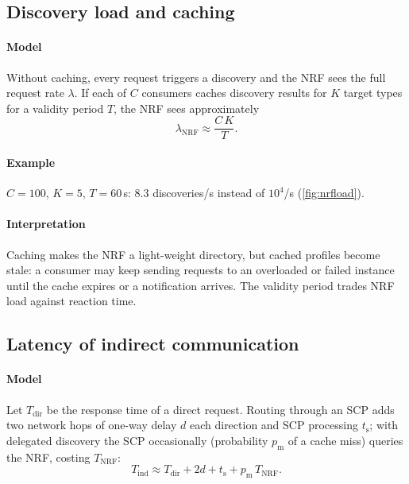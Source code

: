 \documentclass[11pt,a4paper]{article}
\begin{document}
\subsection{Discovery load and caching}\label{sec:cache}
\paragraph{Model} Without caching, every request triggers a discovery and the NRF sees the full request rate $\lambda$. If each of $C$
consumers caches discovery results for $K$ target types for a validity period $T$, the NRF sees approximately
\begin{equation}\label{eq:cache}
  \lambda_{\mathrm{NRF}} \approx \frac{C\,K}{T}.
\end{equation}
\paragraph{Example} $C = 100$, $K = 5$, $T = 60$\,s: 8.3 discoveries/s instead of $10^4$/s (\cref{fig:nrfload}).
\paragraph{Interpretation} Caching makes the NRF a light-weight directory, but cached profiles become stale: a consumer may keep
sending requests to an overloaded or failed instance until the cache expires or a notification arrives. The validity period
trades NRF load against reaction time.

\begin{acnfigure}
  \caption{NRF discovery load versus cache validity (\cref{eq:cache}).}
  \label{fig:nrfload}
\end{acnfigure}

\subsection{Latency of indirect communication}\label{sec:indirect}
\paragraph{Model} Let $T_{\mathrm{dir}}$ be the response time of a direct request. Routing through an SCP adds two network hops of
one-way delay $d$ each direction and SCP processing $t_{\mathrm{s}}$; with delegated discovery the SCP occasionally (probability
$p_{\mathrm{m}}$ of a cache miss) queries the NRF, costing $T_{\mathrm{NRF}}$:
\begin{equation}\label{eq:indirect}
  T_{\mathrm{ind}} \approx T_{\mathrm{dir}} + 2d + t_{\mathrm{s}} + p_{\mathrm{m}}\,T_{\mathrm{NRF}} .
\end{equation}
\end{document}
